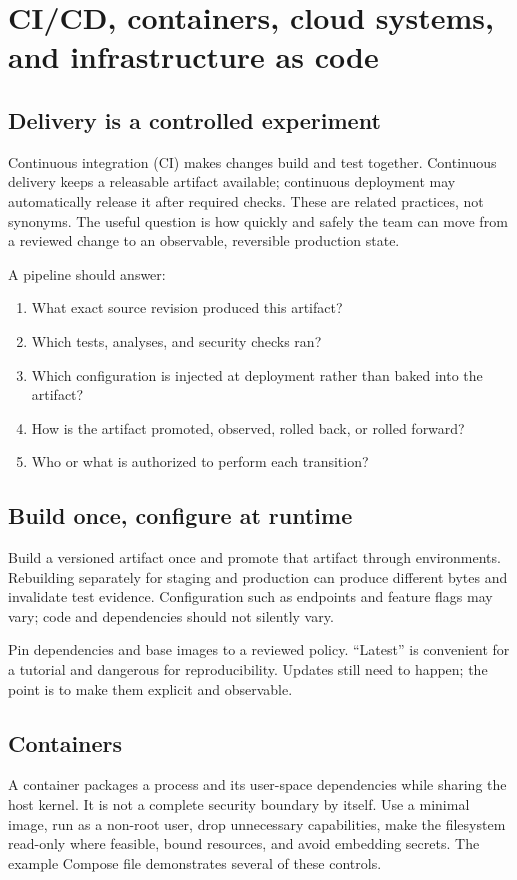 \chapter{CI/CD, containers, cloud systems, and infrastructure as code}

\section{Delivery is a controlled experiment}
Continuous integration (CI) makes changes build and test together. Continuous
delivery keeps a releasable artifact available; continuous deployment may
automatically release it after required checks. These are related practices, not
synonyms. The useful question is how quickly and safely the team can move from a
reviewed change to an observable, reversible production state.

A pipeline should answer:

\begin{enumerate}
  \item What exact source revision produced this artifact?
  \item Which tests, analyses, and security checks ran?
  \item Which configuration is injected at deployment rather than baked into the artifact?
  \item How is the artifact promoted, observed, rolled back, or rolled forward?
  \item Who or what is authorized to perform each transition?
\end{enumerate}

\section{Build once, configure at runtime}
Build a versioned artifact once and promote that artifact through environments.
Rebuilding separately for staging and production can produce different bytes and
invalidate test evidence. Configuration such as endpoints and feature flags may
vary; code and dependencies should not silently vary.

Pin dependencies and base images to a reviewed policy. “Latest” is convenient
for a tutorial and dangerous for reproducibility. Updates still need to happen;
the point is to make them explicit and observable.

\section{Containers}
A container packages a process and its user-space dependencies while sharing the
host kernel. It is not a complete security boundary by itself. Use a minimal
image, run as a non-root user, drop unnecessary capabilities, make the filesystem
read-only where feasible, bound resources, and avoid embedding secrets. The
example Compose file demonstrates several of these controls.

